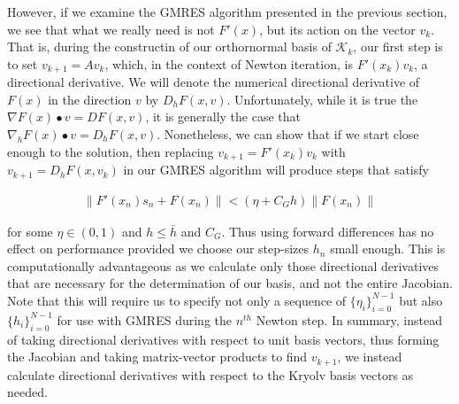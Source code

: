 \documentclass[11pt]{article}
\begin{document}
However, if we examine the GMRES algorithm presented in the previous section, we see that what we really need is not $F'(x)$, but its action on the vector $v_k$. That is, during the constructin of our orthornormal basis of $\mathcal{K}_k$, our first step is to set $v_{k+1} = A v_{k}$, which, in the context of Newton iteration, is $F'(x_k) v_k$, a directional derivative. We will denote the numerical directional derivative of $F(x)$ in the direction $v$ by $D_hF(x, v)$. Unfortunately, while it is true the $\nabla F(x) \bullet v = DF(x, v)$, it is generally the case that $\nabla_h F(x) \bullet v = D_hF(x, v)$. Nonetheless, we can show that if we start close enough to the solution, then replacing $v_{k+1} = F'(x_k) v_k$ with $v_{k+1} = D_hF(x, v_k)$ in our GMRES algorithm will produce steps that satisfy 

\begin{align*}
  \|F'(x_n) s_n + F(x_n) \| < (\eta + C_G h) \|F(x_n) \|
\end{align*}

for some $\eta \in (0,1)$ and $h \leq \bar{h}$ and $C_G$. Thus using forward differences has no effect on performance provided we choose our step-sizes $h_n$ small enough. This is computationally advantageous as we calculate only those directional derivatives that are necessary for the determination of our basis, and not the entire Jacobian. Note that this will require us to specify not only a sequence of $\{ \eta_i \}_{i=0}^{N-1}$  but also $\{ h_i \}_{i=0}^{N-1}$ for use with GMRES during the $n^{th}$ Newton step. In summary, instead of taking directional derivatives with respect to unit basis vectors, thus forming the Jacobian and taking matrix-vector products to find $v_{k+1}$, we instead calculate directional derivatives with respect to the Kryolv basis vectors as needed.
\end{document}
